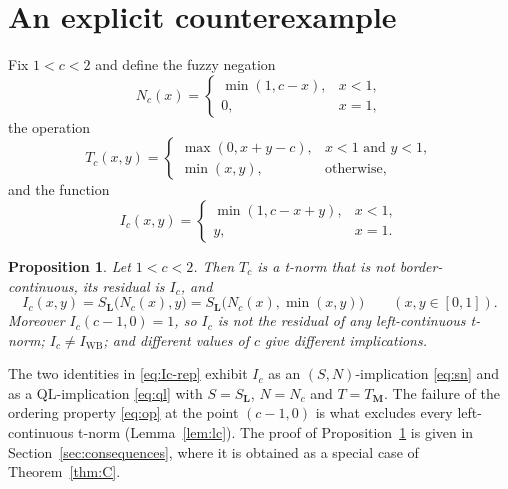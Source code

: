 \documentclass[11pt]{amsart}
\numberwithin{equation}{section}
\newtheorem{proposition}[theorem]{Proposition}
\theoremstyle{definition}
\theoremstyle{remark}
\newcommand{\IWB}{I_{\mathrm{WB}}}
\newcommand{\SL}{S_{\mathbf{L}}}
\newcommand{\TM}{T_{\mathbf{M}}}
\begin{document}
\section{An explicit counterexample}\label{sec:example}

Fix $1<c<2$ and define the fuzzy negation
\begin{equation}\label{eq:Nc}
  N_c(x)=\begin{cases} \min(1,c-x), & x<1,\\ 0, & x=1,\end{cases}
\end{equation}
the operation
\begin{equation}\label{eq:Tc}
  T_c(x,y)=\begin{cases} \max(0,x+y-c), & x<1 \text{ and } y<1,\\
                         \min(x,y), & \text{otherwise},\end{cases}
\end{equation}
and the function
\begin{equation}\label{eq:Ic}
  I_c(x,y)=\begin{cases} \min(1,c-x+y), & x<1,\\ y, & x=1.\end{cases}
\end{equation}

\begin{proposition}\label{prop:A}
Let $1<c<2$. Then $T_c$ is a t-norm that is not border-continuous, its residual
is $I_c$, and
\begin{equation}\label{eq:Ic-rep}
  I_c(x,y)=\SL\bigl(N_c(x),y\bigr)=\SL\bigl(N_c(x),\min(x,y)\bigr)
  \qquad (x,y\in[0,1]).
\end{equation}
Moreover $I_c(c-1,0)=1$, so $I_c$ is not the residual of any left-continuous
t-norm; $I_c\ne\IWB$; and different values of $c$ give different
implications.
\end{proposition}

The two identities in \eqref{eq:Ic-rep} exhibit $I_c$ as an
$(S,N)$-implication \eqref{eq:sn} and as a QL-implication \eqref{eq:ql} with
$S=\SL$, $N=N_c$ and $T=\TM$. The failure of the ordering
property \eqref{eq:op} at the point $(c-1,0)$ is what excludes every
left-continuous t-norm (Lemma~\ref{lem:lc}). The proof of
Proposition~\ref{prop:A} is given in Section~\ref{sec:consequences}, where it
is obtained as a special case of Theorem~\ref{thm:C}.

\end{document}
